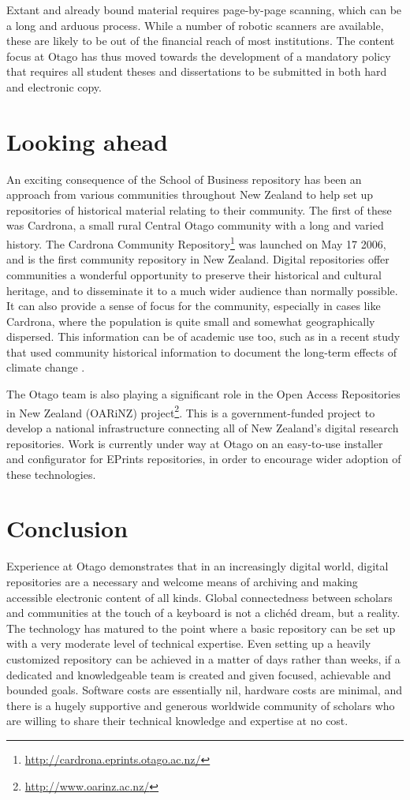 \documentclass[12pt,pdftex,a4paper,titlepage]{article}
\begin{document}
Extant and already bound material requires page-by-page scanning, which can be a long and arduous process. While a number of robotic scanners are available, these are likely to be out of the financial reach of most institutions.  The content focus at Otago has thus moved towards the development of a mandatory policy that requires all student theses and dissertations to be submitted in both hard and electronic copy.


\section{Looking ahead}

An exciting consequence of the School of Business repository has been an approach from various communities throughout New Zealand to help set up repositories of historical material relating to their community. The first of these was Cardrona, a small rural Central Otago community with a long and varied history. The Cardrona Community Repository\footnote{\url{http://cardrona.eprints.otago.ac.nz/}} was launched on May 17 2006, and is the first community repository in New Zealand. Digital repositories offer communities a wonderful opportunity to preserve their historical and cultural heritage, and to disseminate it to a much wider audience than normally possible. It can also provide a sense of focus for the community, especially in cases like Cardrona, where the population is quite small and somewhat geographically dispersed. This information can be of academic use too, such as in a recent study that used community historical information to document the long-term effects of climate change \cite{Hopk-M-2006,Mill-AJ-2006}.

The Otago team is also playing a significant role in the Open Access Repositories in New Zealand (OARiNZ) project\footnote{\url{http://www.oarinz.ac.nz/}}. This is a government-funded project to develop a national infrastructure connecting all of New Zealand's digital research repositories. Work is currently under way at Otago on an easy-to-use installer and configurator for EPrints repositories, in order to encourage wider adoption of these technologies.


\section{Conclusion}

Experience at Otago demonstrates that in an increasingly digital world, digital repositories are a necessary and welcome means of archiving and making accessible electronic content of all kinds. Global connectedness between scholars and communities at the touch of a keyboard is not a clich\'{e}d dream, but a reality. The  technology has matured to the point where a basic repository can be set up with a very moderate level of technical expertise. Even setting up a heavily customized repository can be achieved in a matter of days rather than weeks, if a dedicated and knowledgeable team is created and given focused, achievable and bounded goals. Software costs are essentially nil, hardware costs are minimal, and there is a hugely supportive and generous worldwide community of scholars who are willing to share their technical knowledge and expertise at no cost.
\end{document}
